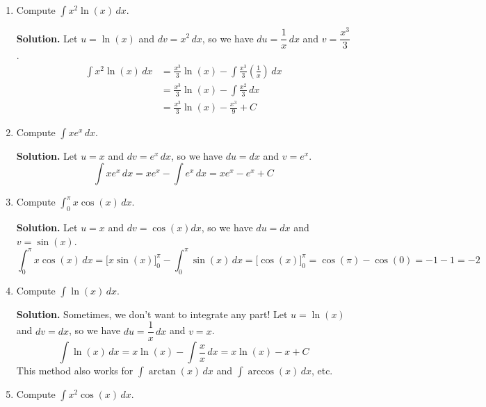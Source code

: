 \begin{Example}{}{}
    \begin{enumerate}[label=(\roman*)]
        \item Compute $ \displaystyle \int x^2\ln(x)\, d{x}  $.

              \textbf{Solution.} Let $ u=\ln(x) $ and $ dv=x^2\,dx $, so we have
              $ du=\dfrac{1}{x} \,dx $ and $ v=\dfrac{x^3}{3} $.
              \begin{align*}
                  \int x^2\ln(x)\, d{x}
                   & =\frac{x^3}{3} \ln(x)-\int \frac{x^3}{3} \left( \frac{1}{x} \right) \, d{x} \\
                   & =\frac{x^3}{3} \ln(x)-\int \frac{x^2}{3}\, d{x}                             \\
                   & =\frac{x^3}{3} \ln(x)-\frac{x^3}{9} +C
              \end{align*}
        \item Compute $ \displaystyle \int x e^x\, d{x} $.

              \textbf{Solution.} Let $ u=x $ and $ dv=e^x\,dx $, so we have $ du=dx $ and $ v=e^x $.
              \[
                  \int x e^x\, d{x}
                  =x e^x-\int e^x\, d{x}
                  =x e^x-e^x+C
              \]
        \item Compute $ \displaystyle \int_{0}^{\pi} x\cos(x)\, d{x} $.

              \textbf{Solution.} Let $ u=x $ and $ dv=\cos(x)dx $, so we have $ du=dx $ and $ v=\sin(x) $.
              \[
                  \int_{0}^{\pi} x\cos(x)\, d{x}
                  =\bigl[x\sin(x)\bigr]^{\pi}_{0}-\int_{0}^{\pi} \sin(x)\, d{x}
                  =\bigl[\cos(x)\bigr]^{\pi}_{0}
                  =\cos(\pi)-\cos(0)
                  =-1-1
                  =-2
              \]
        \item Compute $ \displaystyle \int \ln(x)\, d{x} $.

              \textbf{Solution.} Sometimes, we don't want to integrate any part! Let $ u=\ln(x) $
              and $ dv=dx $, so we have $ du=\dfrac{1}{x}\,dx $ and $ v=x $.
              \[
                  \int \ln(x)\, d{x}
                  =x\ln(x)-\int \frac{x}{x} \, d{x}
                  =x\ln(x)-x+C
              \]
              This method also works for $ \int \arctan(x)\, d{x} $ and
              $ \int \arccos(x)\, d{x} $, etc.
        \item Compute $ \displaystyle  \int x^2\cos(x)\, d{x} $.


\end{enumerate}
\end{Example}
